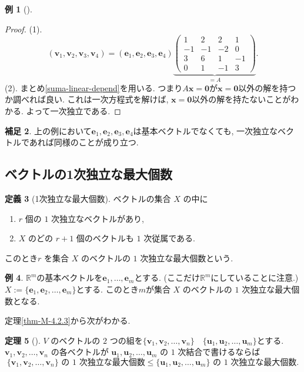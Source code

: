 \documentclass[dvipdfmx,a4paper,11pt]{article} %
\newcommand{\R}{\mathbb{R}}
\theoremstyle{definition}
\newtheorem{thm}{定理}[section]
\newtheorem{defn}[thm]{定義}
\newtheorem{rem}[thm]{補足}
\newtheorem{eg}[thm]{例}
\begin{document}
\begin{eg}[{\cite[例題4.2.2]{M}}]
\begin{proof}
(1). \[
(\bm{v}_1,\bm{v}_2,\bm{v}_3,\bm{v}_4)
=(\bm{e}_1,\bm{e}_2,\bm{e}_3,\bm{e}_4)
\underbrace{
\begin{pmatrix}
1&2&2&1\\
-1&-1&-2&0\\
3&6&1&-1\\
0&1&-1&3
\end{pmatrix}
}_{=A}.
\]
(2). まとめ\ref{suma-linear-depend}を用いる. 
つまり$A \bm{x}=\bm{0}$が$ \bm{x}=\bm{0}$以外の解を持つか調べれば良い. 
これは一次方程式を解けば, $ \bm{x}=\bm{0}$以外の解を持たないことがわかる. 
よって一次独立である. 
\end{proof}
\end{eg}

\begin{rem}
上の例において$\bm{e}_1, \bm{e}_2, \bm{e}_3, \bm{e}_4$は基本ベクトルでなくても, 一次独立なベクトルであれば同様のことが成り立つ. 
\end{rem}


\subsection{ベクトルの1次独立な最大個数  \cite[4.3節]{M}}

\begin{defn}[1次独立な最大個数]
ベクトルの集合 \(X\) の中に 
\begin{enumerate}
\item \(r\) 個の \(1\) 次独立なベクトルがあり, 
\item \(X\) のどの \(r+1\) 個のベクトルも \(1\) 次従属である.
\end{enumerate}
このとき\(r\) を集合 \(X\) のベクトルの \(1\) 次独立な最大個数という.
\end{defn}

\begin{eg}
\label{ex-M-4.3.1}
$\R^m$の基本ベクトルを$\bm{e}_1, \ldots, \bm{e}_m$とする. (ここだけ$\R^m$にしていることに注意.) 
$X:=\{ \bm{e}_1,\bm{e}_2,\ldots,\bm{e}_m\}$とする. 
このとき$m$が集合 \(X\) のベクトルの \(1\) 次独立な最大個数となる. 
\end{eg}

定理\ref{thm-M-4.2.3}から次がわかる. 
\begin{thm}[{\cite[定理4.3.1]{M}}] 
\label{thm-M-4.3.1}
\(V\) のベクトルの \(2\) つの組を\(\{\bm{v}_1,\bm{v}_2,\ldots,\bm{v}_n\} \quad\allowbreak \{\bm{u}_1,\bm{u}_2,\ldots,\bm{u}_m\}\)とする. 
\(\bm{v}_1,\bm{v}_2,\ldots,\bm{v}_n\) の各ベクトルが \(\bm{u}_1,\bm{u}_2,\ldots,\bm{u}_m\) の \(1\) 次結合で書けるならば
\[
\{\bm{v}_1,\bm{v}_2,\ldots,\bm{v}_n\}\text{ の \(1\) 次独立な最大個数}
\leq
\{\bm{u}_1,\bm{u}_2,\ldots,\bm{u}_m\}\text{ の \(1\) 次独立な最大個数}.
\]
\end{thm}
\end{document}
